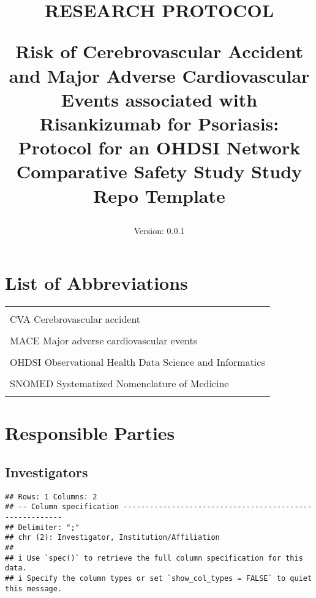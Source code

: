 \documentclass[
  12pt,
]{article}
\title{RESEARCH PROTOCOL

\textbar Risk of Cerebrovascular Accident and Major Adverse Cardiovascular Events associated with Risankizumab for Psoriasis: Protocol for an OHDSI Network Comparative Safety Study
\textbar{} Study Repo Template}
\subtitle{Version: 0.0.1}
\author{}
\date{\vspace{-2.5em}}
\begin{document}
\maketitle

\thispagestyle{fancy} %

{
\setcounter{tocdepth}{2}
\tableofcontents
}
\hypertarget{list-of-abbreviations}{%
\section{List of Abbreviations}\label{list-of-abbreviations}}

\begin{table}[!h]
\centering\begingroup\fontsize{8}{10}\selectfont

\begin{tabular}{l}
\toprule
\cellcolor{gray!6}{CDM  Common Data Model}\\
CVA Cerebrovascular accident\\
\cellcolor{gray!6}{IL   Interleukin}\\
MACE    Major adverse cardiovascular events\\
\cellcolor{gray!6}{OMOP Observational Medical Outcomes Partnership}\\
OHDSI   Observational Health Data Science and Informatics\\
\cellcolor{gray!6}{RxNorm   US-specific terminology that contains all medications available on the US market}\\
SNOMED  Systematized Nomenclature of Medicine\\
\cellcolor{gray!6}{TIA  Transient Ischaemic Attack}\\
\bottomrule
\end{tabular}
\endgroup{}
\end{table}

\clearpage

\hypertarget{responsible-parties}{%
\section{Responsible Parties}\label{responsible-parties}}

\hypertarget{investigators}{%
\subsection{Investigators}\label{investigators}}

\begin{verbatim}
## Rows: 1 Columns: 2
## -- Column specification --------------------------------------------------------
## Delimiter: ";"
## chr (2): Investigator, Institution/Affiliation
## 
## i Use `spec()` to retrieve the full column specification for this data.
## i Specify the column types or set `show_col_types = FALSE` to quiet this message.
\end{verbatim}
\end{document}
